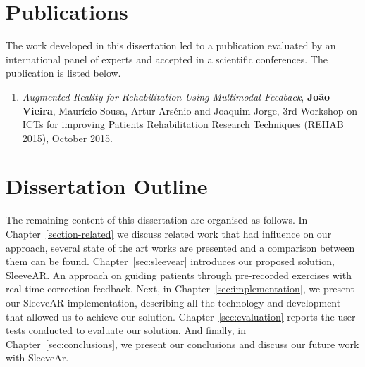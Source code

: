 \section{Publications}


The work developed in this dissertation led to a publication evaluated by an international panel of experts and accepted in a scientific conferences. The publication is listed below.

\begin{enumerate}
\item \textit{Augmented Reality for Rehabilitation Using Multimodal Feedback}, \textbf{Jo\~{a}o Vieira}, Maur\'icio Sousa, Artur Ars\'enio and Joaquim Jorge, 3rd Workshop on ICTs for improving Patients Rehabilitation Research Techniques (REHAB 2015), October 2015.
\end{enumerate}


\section{Dissertation Outline}

The remaining content of this dissertation are organised as follows. 
In Chapter~\ref{section-related} we discuss related work that had influence on our approach, several state of the art works are presented and a comparison between them can be found. 
Chapter~\ref{sec:sleevear} introduces our proposed solution, SleeveAR. An approach on guiding patients through pre-recorded exercises with real-time correction feedback.
Next, in Chapter~\ref{sec:implementation}, we present our SleeveAR implementation, describing all the technology and development that allowed us to achieve our solution.
Chapter~\ref{sec:evaluation} reports the user tests conducted to evaluate our solution. 
And finally, in Chapter~\ref{sec:conclusions}, we present our conclusions and discuss our future work with SleeveAr.